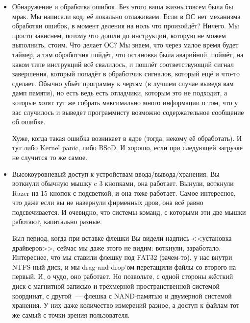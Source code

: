 \documentclass{article}
\begin{document}
\begin{enumerate}
\begin{itemize}
            \item Обнаружение и обработка ошибок. Без этого ваша жизнь совсем была бы мрак. Мы написали код, её локально отлаживаем. Если в ОС нет механизма обработки ошибок, в момент деления на ноль что произойдёт? Ничего. Мы просто зависнем, потому что дошли до инструкции, которую не можем выполнить, стоим. Что делает ОС? Мы знаем, что через малое время будет таймер, а там обработчик пойдёт, что остановка была аварийной, поймёт, на каком типе инструкций всё свалилось, и пошлёт соответствующий сигнал завершения, который попадёт в обработчик сигналов, который ещё и что-то сделает. Обычно убьёт программу к чертям (в лучшем случае выведя вам дамп памяти), но есть ведь есть отладчики, которым это не подходит, а которые хотят тут же собрать максимально много информации о том, что у вас случилось и выведет программисту возможно содержательное сообщение об ошибке.

            Хуже, когда такая ошибка возникает в ядре (тогда, некому её обработать). И тут либо Kernel panic, либо BSoD. И хорошо, если при следующей загрузке не случится то же самое.
            
            \item Высокоуровневый доступ к устройствам ввода/вывода/хранения.
            Вы воткнули обычную мышку c 3 кнопками, она работает. Вынули, воткнули Razer на 15 кнопок с подсветкой, и она тоже работает. Самое интересное, что даже если вы не навернули фирменных дров, она всё равно подсвечивается. И очевидно, что системы команд, с которыми эти две мышки работают, капитально разные.
            
            Был период, когда при вставке флешки Вы видели надпись <<установка драйверов>>, сейчас мы даже этого не видим: воткнули, заработало. Интереснее, что мы ставили флешку под FAT32 (зачем-то), у нас внутри NTFS-ный диск, и мы drag-and-drop'ом перетащили файлы со второго на первый. И, о чудо, оно работает. Но позвольте, с одной стороны жёсткий диск с магнитной записью и трёхмерной пространственной системой координат, с другой~--- флешка с NAND-памятью и двумерной системой хранения. У них даже количество измерений разное, а доступ к файлам тот же самый с точки зрения пользователя.
            

\end{itemize}
\end{enumerate}
\end{document}
